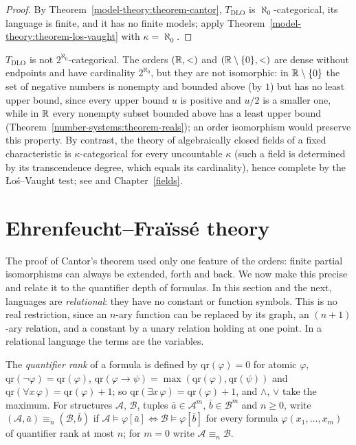 \begin{proof}
By Theorem~\ref{model-theory:theorem-cantor}, $T_{\mathrm{DLO}}$ is $\aleph_0$-categorical, its language is finite, and it has no finite models; apply
Theorem~\ref{model-theory:theorem-los-vaught} with $\kappa = \aleph_0$.
\end{proof}

\begin{counterexample}\label{model-theory:counterexample-dlo-continuum}
$T_{\mathrm{DLO}}$ is not $2^{\aleph_0}$-categorical. The orders $(\mathbb{R}, <)$ and $(\mathbb{R} \setminus \{0\}, <)$ are dense without endpoints and have cardinality
$2^{\aleph_0}$, but they are not isomorphic: in $\mathbb{R} \setminus \{0\}$ the set of negative numbers is nonempty and bounded above (by $1$) but has no least upper
bound, since every upper bound $u$ is positive and $u/2$ is a smaller one, while in $\mathbb{R}$ every nonempty subset bounded above has a least upper bound
(Theorem~\ref{number-systems:theorem-reals}); an order isomorphism would preserve this property. By contrast, the theory of algebraically closed fields of a
fixed characteristic is $\kappa$-categorical for every uncountable $\kappa$ (such a field is determined by its transcendence degree, which equals its cardinality),
hence complete by the Łoś--Vaught test; see \cite[Section 2.2]{marker-model-theory} and Chapter~\ref{fields}.
\end{counterexample}

\section{Ehrenfeucht--Fra\"iss\'e theory}\label{model-theory:section-ehrenfeucht-fraisse}

The proof of Cantor's theorem used only one feature of the orders: finite partial isomorphisms can always be extended, forth and back. We now make this
precise and relate it to the quantifier depth of formulas. In this section and the next, languages are \emph{relational}: they have no constant or function
symbols. This is no real restriction, since an $n$-ary function can be replaced by its graph, an $(n+1)$-ary relation, and a constant by a unary relation
holding at one point. In a relational language the terms are the variables.

\begin{definition}\label{model-theory:definition-quantifier-rank}
The \emph{quantifier rank} of a formula is defined by $\mathrm{qr}(\varphi) = 0$ for atomic $\varphi$, $\mathrm{qr}(\neg\varphi) = \mathrm{qr}(\varphi)$,
$\mathrm{qr}(\varphi \to \psi) = \max(\mathrm{qr}(\varphi), \mathrm{qr}(\psi))$ and $\mathrm{qr}(\forall x\,\varphi) = \mathrm{qr}(\varphi) + 1$; so
$\mathrm{qr}(\exists x\,\varphi) = \mathrm{qr}(\varphi) + 1$, and $\wedge$, $\vee$ take the maximum. For structures $\mathcal{A}$, $\mathcal{B}$, tuples
$\bar{a} \in \mathcal{A}^m$, $\bar{b} \in \mathcal{B}^m$ and $n \geq 0$, write $(\mathcal{A}, \bar{a}) \equiv_n (\mathcal{B}, \bar{b})$ if
$\mathcal{A} \models \varphi[\bar{a}] \iff \mathcal{B} \models \varphi[\bar{b}]$ for every formula $\varphi(x_1, \ldots, x_m)$ of quantifier rank at most $n$; for
$m = 0$ write $\mathcal{A} \equiv_n \mathcal{B}$.
\end{definition}


